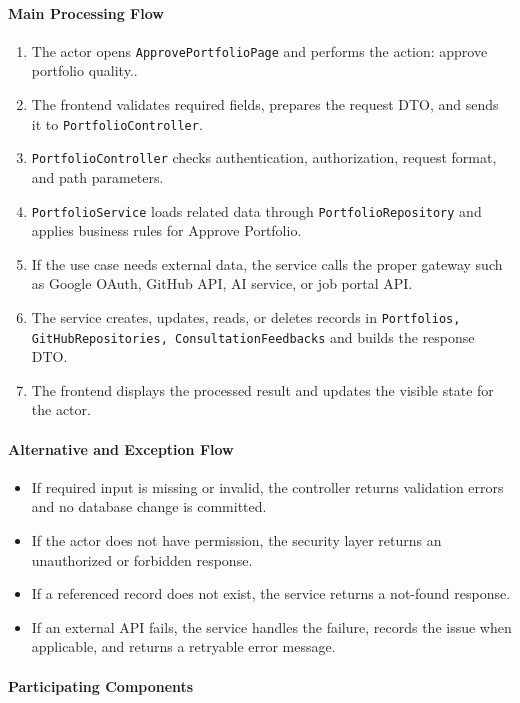 \paragraph{Main Processing Flow}

\begin{enumerate}
    \item The actor opens \texttt{ApprovePortfolioPage} and performs the action: approve portfolio quality..
    \item The frontend validates required fields, prepares the request DTO, and sends it to \texttt{PortfolioController}.
    \item \texttt{PortfolioController} checks authentication, authorization, request format, and path parameters.
    \item \texttt{PortfolioService} loads related data through \texttt{PortfolioRepository} and applies business rules for Approve Portfolio.
    \item If the use case needs external data, the service calls the proper gateway such as Google OAuth, GitHub API, AI service, or job portal API.
    \item The service creates, updates, reads, or deletes records in \texttt{Portfolios, GitHubRepositories, ConsultationFeedbacks} and builds the response DTO.
    \item The frontend displays the processed result and updates the visible state for the actor.
\end{enumerate}

\paragraph{Alternative and Exception Flow}

\begin{itemize}
    \item If required input is missing or invalid, the controller returns validation errors and no database change is committed.
    \item If the actor does not have permission, the security layer returns an unauthorized or forbidden response.
    \item If a referenced record does not exist, the service returns a not-found response.
    \item If an external API fails, the service handles the failure, records the issue when applicable, and returns a retryable error message.
\end{itemize}

\paragraph{Participating Components}

